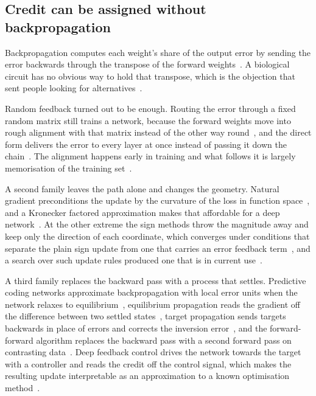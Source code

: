 \subsection{Credit can be assigned without backpropagation}
\label{sec:bg_credit}

Backpropagation computes each weight's share of the output error by sending
the error backwards through the transpose of the forward
weights~\cite{rumelhart_learning_1986}. A biological circuit has no obvious
way to hold that transpose, which is the objection that sent people looking
for alternatives~\cite{crick_recent_1989}.

Random feedback turned out to be enough. Routing the error through a fixed
random matrix still trains a network, because the forward weights move into
rough alignment with that matrix instead of the other way
round~\cite{lillicrap_random_2016}, and the direct form delivers the error to
every layer at once instead of passing it down the
chain~\cite{nokland_direct_2016}. The alignment happens early in training and
what follows it is largely memorisation of the training
set~\cite{refinetti_align_2021}.

A second family leaves the path alone and changes the geometry. Natural gradient
preconditions the update by the curvature of the loss in function
space~\cite{amari_natural_1998}, and a Kronecker factored approximation makes
that affordable for a deep network~\cite{martens_optimizing_2015}. At the
other extreme the sign methods throw the magnitude away and keep only the
direction of each coordinate, which converges under conditions that separate
the plain sign update from one that carries an error feedback
term~\cite{bernstein_signsgd_2018, karimireddy_error_2019}, and a search over
such update rules produced one that is in current
use~\cite{chen_lion_2024}.

A third family replaces the backward pass with a process that settles.
Predictive coding networks approximate backpropagation with local error units
when the network relaxes to equilibrium~\cite{whittington_approximation_2017},
equilibrium propagation reads the gradient off the difference between two
settled states~\cite{scellier_equilibrium_2017}, target propagation sends
targets backwards in place of errors and corrects the inversion
error~\cite{lee_difference_2015}, and the forward-forward algorithm replaces
the backward pass with a second forward pass on contrasting
data~\cite{hinton_forward_2022}. Deep feedback control drives the network
towards the target with a controller and reads the credit off the control
signal, which makes the resulting update interpretable as an approximation to
a known optimisation
method~\cite{meulemans_credit_2021, meulemans_least_2022}.

